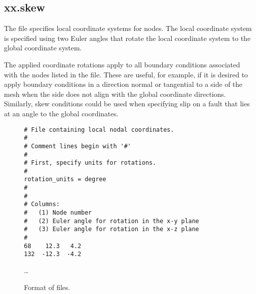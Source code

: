 \subsection{xx.skew}

The  file specifies local coordinate systems for
nodes. The local coordinate system is specified using two Euler angles
that rotate the local coordinate system to the global coordinate
system.

The applied coordinate rotations apply to all boundary conditions
associated with the nodes listed in the file. These are useful, for
example, if it is desired to apply boundary conditions in a direction
normal or tangential to a side of the mesh when the side does not
align with the global coordinate directions.  Similarly, skew
conditions could be used when specifying slip on a fault that lies at
an angle to the global coordinates.

\begin{figure}
  \begin{center}
\begin{verbatim}
# File containing local nodal coordinates.
#
# Comment lines begin with '#'
#
# First, specify units for rotations.
#
rotation_units = degree
#
#
# Columns:
#   (1) Node number
#   (2) Euler angle for rotation in the x-y plane
#   (3) Euler angle for rotation in the x-z plane
#
68    12.3   4.2
132  -12.3  -4.2
\end{verbatim}
    \ldots
    \caption{Format of  files.}
  \end{center}
\end{figure}
